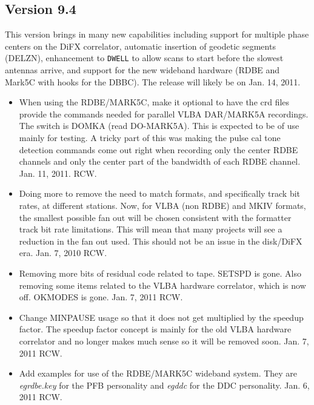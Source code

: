 \documentclass{report}
\begin{document}
\subsection{\label{SSEC:VER_9.4}Version 9.4}

This version brings in many new capabilities including support for
multiple phase centers on the DiFX correlator, automatic insertion
of geodetic segments (DELZN), enhancement to {\tt DWELL} to allow
scans to start before the slowest antennas arrive, and support for
the new wideband hardware (RDBE and Mark5C with hooks for the DBBC).
The release will likely be on Jan. 14, 2011.

\begin{itemize}

\item When using the RDBE/MARK5C, make it optional to have the crd
files provide the commands needed for parallel VLBA DAR/MARK5A recordings.
The switch is DOMKA (read DO-MARK5A).  This is expected to be of use
mainly for testing.  A tricky part of this was making the pulse cal
tone detection commands come out right when recording only the center
RDBE channels and only the center part of the bandwidth of each RDBE
channel.  Jan. 11, 2011.  RCW.

\item Doing more to remove the need to match formats, and specifically
track bit rates, at different stations.  Now, for VLBA (non RDBE) and
MKIV formats, the smallest possible fan out will be chosen consistent
with the formatter track bit rate limitations.  This will mean that
many projects will see a reduction in the fan out used.  This should
not be an issue in the disk/DiFX era.  Jan. 7, 2010  RCW.

\item Removing more bits of residual code related to tape.  SETSPD is
gone.  Also removing some items related to the VLBA hardware
correlator, which is now off.  OKMODES is gone.  Jan. 7, 2011 RCW.

\item Change MINPAUSE usage so that it does not get multiplied by the
speedup factor.  The speedup factor concept is mainly for the old
VLBA hardware correlator and no longer makes much sense so it will be
removed soon.  Jan. 7, 2011  RCW.

\item Add examples for use of the RDBE/MARK5C wideband system.  They are
{\sl egrdbe.key} for the PFB personality and {\sl egddc} for the DDC
personality.  Jan. 6, 2011 RCW.


\end{itemize}
\end{document}
